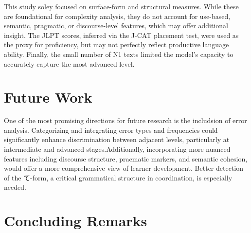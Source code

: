 This study soley focused on surface-form and structural measures. While these are foundational for complexity
analysis, they do not account for use-based, semantic, pragmatic, or discourse-level features, which may offer
additional insight. The JLPT scores, inferred via the J-CAT placement test, were used as the proxy for proficiency,
but may not perfectly reflect productive language ability. Finally, the small number of N1 texts limited the model's
capacity to accurately capture the most advanced level.

\section{Future Work}
%
%
%
%

One of the most promising directions for future research is the includsion of error analysis. Categorizing and
integrating error types and frequencies could significantly enhance discrimination between adjacent levels,
particularly at intermediate and advanced stages.Additionally, incorporating more nuanced features including
discourse structure, pracmatic markers, and semantic cohesion, would offer a more comprehensive view of learner
development. Better detection of the て-form, a critical grammatical structure in coordination, is especially needed.






\section{Concluding Remarks}

